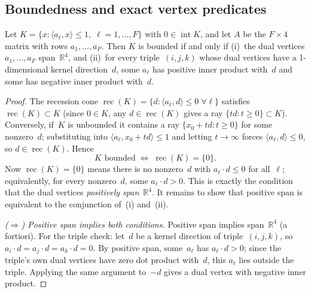 \subsection{Boundedness and exact vertex predicates}

\begin{unverified}
\begin{proposition}\label{prop:boundedness-iff}
Let $K = \{x : \langle a_\ell, x \rangle \le 1,\; \ell = 1, \ldots, F\}$
with $0 \in \operatorname{int} K$, and let $A$ be the $F \times 4$ matrix
with rows $a_1, \ldots, a_F$. Then $K$ is
bounded if and only if
\textup{(i)}~the dual vertices $a_1, \ldots, a_F$ span~$\mathbb{R}^4$, and
\textup{(ii)}~for every triple~$(i,j,k)$ whose dual vertices have a 1-dimensional
kernel direction~$d$, some $a_\ell$ has positive inner product with~$d$ and some
has negative inner product with~$d$.
\end{proposition}

\begin{proof}
The recession cone $\operatorname{rec}(K) = \{d : \langle a_\ell, d \rangle \le 0\;\forall \ell\}$ satisfies
$\operatorname{rec}(K) \subset K$ (since $0 \in K$, any $d \in
\operatorname{rec}(K)$ gives a ray $\{td : t \ge 0\} \subset K$).
Conversely, if~$K$ is unbounded it contains a ray $\{x_0 + td : t \ge 0\}$
for some nonzero~$d$; substituting into $\langle a_\ell, x_0 + td \rangle \le 1$ and letting
$t \to \infty$ forces $\langle a_\ell, d \rangle \le 0$, so $d \in \operatorname{rec}(K)$.  Hence
\[
  K \text{ bounded}
  \;\Longleftrightarrow\;
  \operatorname{rec}(K) = \{0\}.
\]
Now $\operatorname{rec}(K) = \{0\}$ means there is no nonzero~$d$ with
$a_\ell \cdot d \le 0$ for all~$\ell$; equivalently, for every nonzero~$d$,
some $a_\ell \cdot d > 0$.  This is exactly the condition that the dual vertices
\emph{positively span}~$\mathbb{R}^4$.  It remains to show that positive span
is equivalent to the conjunction of~\textup{(i)} and~\textup{(ii)}.

\medskip\noindent\emph{($\Rightarrow$) Positive span implies both conditions.}
Positive span implies span~$\mathbb{R}^4$ (a fortiori). For the triple check:
let~$d$ be a kernel direction of triple~$(i,j,k)$, so $a_i \cdot d = a_j
\cdot d = a_k \cdot d = 0$. By positive span, some~$a_\ell$ has $a_\ell \cdot
d > 0$; since the triple's own dual vertices have zero dot product with~$d$, this
$a_\ell$ lies outside the triple. Applying the same argument to~$-d$ gives a
dual vertex with negative inner product.


\end{proof}
\end{unverified}
